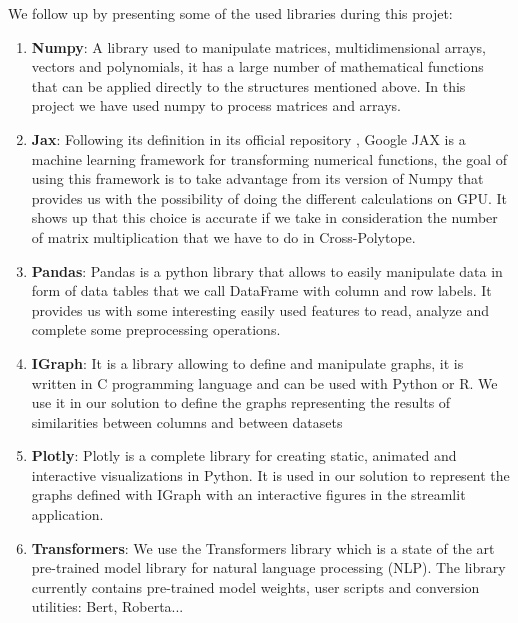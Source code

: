 We follow up by presenting some of the used libraries during this projet:

\begin{enumerate}
    \item \textbf{Numpy}:
A library used to manipulate matrices, multidimensional arrays, vectors and
polynomials, it has a large number of mathematical functions that can be applied
directly to the structures mentioned above. In this project we have used numpy
to process matrices and arrays.
    
    \item \textbf{Jax}:
Following its definition in its official repository \citep{jax_2022}, Google JAX
is a machine learning framework for transforming numerical functions, the goal
of using this framework is to take advantage from its version of Numpy that
provides us with the possibility of doing the different calculations on GPU. It
shows up that this choice is accurate if we take in consideration the number of
matrix multiplication that we have to do in Cross-Polytope.

    \item \textbf{Pandas}:
Pandas is a python library that allows to easily manipulate data in form of data
tables that we call DataFrame with column and row labels. It provides us with
some interesting easily used features to read, analyze and complete some
preprocessing operations.

    \item \textbf{IGraph}:
It is a library allowing to define and manipulate graphs, it is written in C
programming language and can be used with Python or R. We use it in our solution
to define the graphs representing the results of similarities between columns
and between datasets

    \item \textbf{Plotly}:
Plotly is a complete library for creating static, animated and interactive
visualizations in Python. It is used in our solution to represent the graphs
defined with IGraph with an interactive figures in the streamlit application.

    \item \textbf{Transformers}:
We use the Transformers library which is a state of the art pre-trained model
library for natural language processing (NLP). The library currently contains
pre-trained model weights, user scripts and conversion utilities: Bert,
Roberta...

\end{enumerate}


